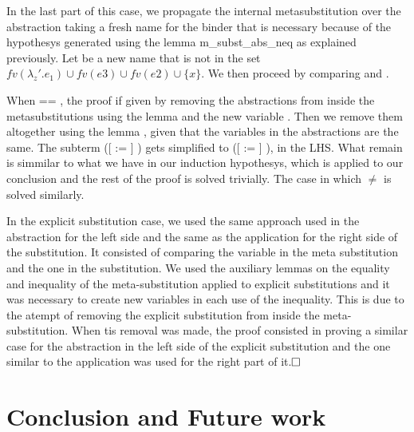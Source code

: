 \begin{coqdoccode}
\end{coqdoccode}
In the last part of this case, we propagate the internal metasubstitution over the abstraction taking a fresh name for the binder that is necessary because of the hypothesys generated using the lemma m\_subst\_abs\_neq as explained previously. Let  be a new name that is not in the set $fv(\lambda_z'.e_1) \cup fv(e3) \cup fv(e2) \cup \{x\}$. We then proceed by comparing  and .
\begin{coqdoccode}
\end{coqdoccode}
When  == , the proof if given by removing the abstractions from inside the metasubstitutions using the lemma  and the new variable . Then we remove them altogether using the lemma , given that the variables in the abstractions are the same. The subterm    ([ := ]    ) gets simplified to ([ := ]    ), in the LHS. What remain is simmilar to what we have in our induction hypothesys, which is applied to our conclusion and the rest of the proof is solved trivially. The case in which  \ensuremath{\not=}  is solved similarly.
\begin{coqdoccode}
\end{coqdoccode}
In the explicit substitution case, we used the same approach used in the abstraction for the left side and the same as the application for the right side of the substitution. It consisted of comparing the variable in the meta substitution and the one in the substitution. We used the auxiliary lemmas on the equality and inequality of the meta-substitution applied to explicit substitutions and it was necessary to create new variables in each use of the inequality. This is due to the atempt of removing the explicit substitution from inside the meta-substitution. When tis removal was made, the proof consisted in proving a similar case for the abstraction in the left side of the explicit substitution and the one similar to the application was used for the right part of it.$\hfill\Box$
\begin{coqdoccode}
\coqdocemptyline
\end{coqdoccode}
\section{Conclusion and Future work}



